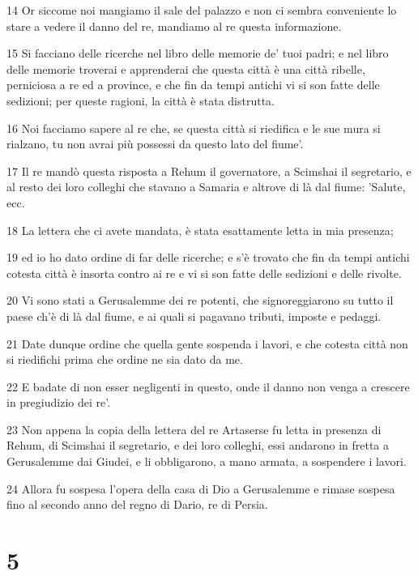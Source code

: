 \par 14 Or siccome noi mangiamo il sale del palazzo e non ci sembra conveniente lo stare a vedere il danno del re, mandiamo al re questa informazione.
\par 15 Si facciano delle ricerche nel libro delle memorie de' tuoi padri; e nel libro delle memorie troverai e apprenderai che questa città è una città ribelle, perniciosa a re ed a province, e che fin da tempi antichi vi si son fatte delle sedizioni; per queste ragioni, la città è stata distrutta.
\par 16 Noi facciamo sapere al re che, se questa città si riedifica e le sue mura si rialzano, tu non avrai più possessi da questo lato del fiume'.
\par 17 Il re mandò questa risposta a Rehum il governatore, a Scimshai il segretario, e al resto dei loro colleghi che stavano a Samaria e altrove di là dal fiume: 'Salute, ecc.
\par 18 La lettera che ci avete mandata, è stata esattamente letta in mia presenza;
\par 19 ed io ho dato ordine di far delle ricerche; e s'è trovato che fin da tempi antichi cotesta città è insorta contro ai re e vi si son fatte delle sedizioni e delle rivolte.
\par 20 Vi sono stati a Gerusalemme dei re potenti, che signoreggiarono su tutto il paese ch'è di là dal fiume, e ai quali si pagavano tributi, imposte e pedaggi.
\par 21 Date dunque ordine che quella gente sospenda i lavori, e che cotesta città non si riedifichi prima che ordine ne sia dato da me.
\par 22 E badate di non esser negligenti in questo, onde il danno non venga a crescere in pregiudizio dei re'.
\par 23 Non appena la copia della lettera del re Artaserse fu letta in presenza di Rehum, di Scimshai il segretario, e dei loro colleghi, essi andarono in fretta a Gerusalemme dai Giudei, e li obbligarono, a mano armata, a sospendere i lavori.
\par 24 Allora fu sospesa l'opera della casa di Dio a Gerusalemme e rimase sospesa fino al secondo anno del regno di Dario, re di Persia.

\chapter{5}

